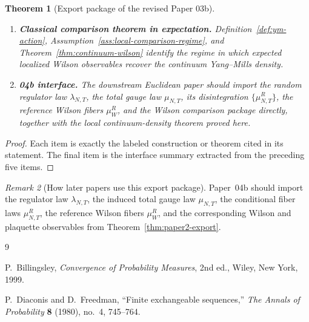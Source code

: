 \documentclass[11pt]{article}
\newtheorem{theorem}{Theorem}[section]
\theoremstyle{definition}
\theoremstyle{remark}
\newtheorem{remark}[theorem]{Remark}
\begin{document}
\begin{theorem}[Export package of the revised Paper 03b]
\begin{enumerate}[leftmargin=1.5em,label=\textnormal{(\roman*)}]
comparison connection \(A^\infty\) and curvature \(F^\infty\).
\item \textbf{Classical comparison theorem in expectation.}
Definition~\ref{def:ym-action},
Assumption~\ref{ass:local-comparison-regime}, and
Theorem~\ref{thm:continuum-wilson} identify the regime in which expected
localized Wilson observables recover the continuum Yang--Mills density.
\item \textbf{04b interface.}
The downstream Euclidean paper should import the random regulator law
\(\lambda_{N,T}\), the total gauge law \(\mu_{N,T}\), its disintegration
\(\{\mu_{N,T}^R\}\), the reference Wilson fibers \(\mu_W^R\), and the Wilson
comparison package directly, together with the local continuum-density theorem
proved here.
\end{enumerate}
\end{theorem}

\begin{proof}
Each item is exactly the labeled construction or theorem cited in its
statement. The final item is the interface summary extracted from the preceding
five items.
\end{proof}

\begin{remark}[How later papers use this export package]
Paper~04b should import the regulator law \(\lambda_{N,T}\), the induced total
gauge law \(\mu_{N,T}\), the conditional fiber laws \(\mu_{N,T}^R\), the
reference Wilson fibers \(\mu_W^R\), and the corresponding Wilson and plaquette
observables from Theorem~\ref{thm:paper2-export}.
\end{remark}

\begin{thebibliography}{9}

P.~Billingsley,
\emph{Convergence of Probability Measures},
2nd ed.,
Wiley, New York, 1999.

P.~Diaconis and D.~Freedman,
``Finite exchangeable sequences,''
\emph{The Annals of Probability} \textbf{8} (1980), no.~4, 745--764.

\end{thebibliography}
\end{document}
